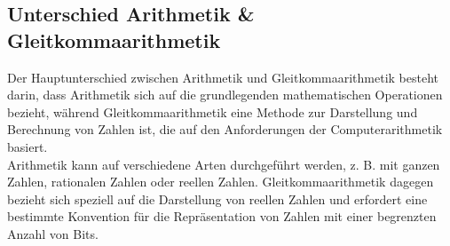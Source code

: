 \documentclass [final]{article}
\theoremstyle{definition}
\begin{document}
\subsection{Unterschied Arithmetik \& Gleitkommaarithmetik}
Der Hauptunterschied zwischen Arithmetik und Gleitkommaarithmetik besteht darin, dass Arithmetik sich auf die grundlegenden mathematischen Operationen bezieht, während Gleitkommaarithmetik eine Methode zur Darstellung und Berechnung von Zahlen ist, die auf den Anforderungen der Computerarithmetik basiert.  \\
Arithmetik kann auf verschiedene Arten durchgeführt werden, z. B. mit ganzen Zahlen, rationalen Zahlen oder reellen Zahlen. Gleitkommaarithmetik dagegen bezieht sich speziell auf die Darstellung von reellen Zahlen und erfordert eine bestimmte Konvention für die Repräsentation von Zahlen mit einer begrenzten Anzahl von Bits.


\end{document}
